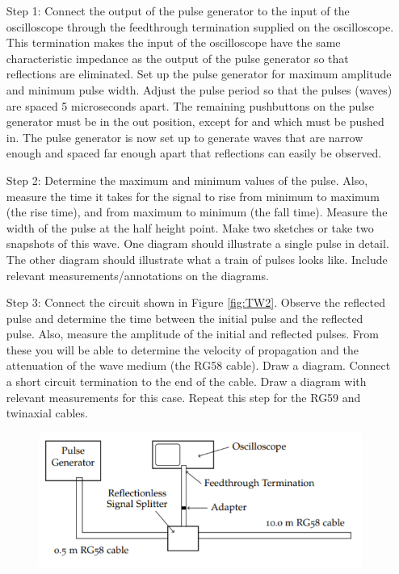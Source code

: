 \begin{itemize}[leftmargin = 50pt]
    \item[Step 1:] Connect the output of the pulse generator to the input of the oscilloscope through the feedthrough termination supplied on the oscilloscope. This termination makes the input of the oscilloscope have the same characteristic impedance as the output of the pulse generator so that reflections are eliminated. Set up the pulse generator for maximum amplitude and minimum pulse width. Adjust the pulse period so that the pulses (waves) are spaced 5 microseconds apart. The remaining pushbuttons on the pulse generator must be in the out position, except for  and  which must be pushed in. The pulse generator is now set up to generate waves that are narrow enough and spaced far enough apart that reflections can easily be observed.
    \item[Step 2:] Determine the maximum and minimum values of the pulse. Also, measure the time it takes for the signal to rise from minimum to maximum (the rise time), and from maximum to minimum (the fall time). Measure the width of the pulse at the half height point. Make two sketches or take two snapshots of this wave. One diagram should illustrate a single pulse in detail. The other diagram should illustrate what a train of pulses looks like. Include relevant measurements/annotations on the diagrams.
    \item[Step 3:] Connect the circuit shown in Figure \ref{fig:TW2}. Observe the reflected pulse and determine the time between the initial pulse and the reflected pulse. Also, measure the amplitude of the initial and reflected pulses. From these you will be able to determine the velocity of propagation and the attenuation of the wave medium (the RG58 cable). Draw a diagram. Connect a short circuit termination to the end of the cable. Draw a diagram with relevant measurements for this case. Repeat this step for the RG59 and twinaxial cables.
        \begin{figure}[H]
    \centering
    \includegraphics[scale = 0.8]{Images/TW2.PNG}

\end{figure}
\end{itemize}
